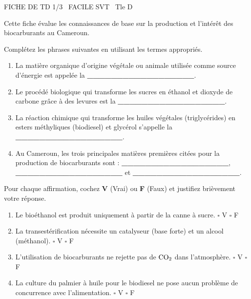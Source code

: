 \documentclass[11pt]{article}
\begin{document}
\begin{tcolorbox}[enhanced,colback=popink,colframe=popink,arc=10pt,boxrule=0pt,left=12pt,right=12pt,top=9pt,bottom=9pt]
{\color{white}\popxbold\small FICHE DE TD 1/3 \textbullet\ FACILE \hfill SVT \textbullet\ Tle D\par}
\end{tcolorbox}
\vspace{4pt}
Cette fiche évalue les connaissances de base sur la production et l'intérêt des biocarburants au Cameroun.

\begin{exercice}
Complétez les phrases suivantes en utilisant les termes appropriés.
\begin{enumerate}
    \item La matière organique d'origine végétale ou animale utilisée comme source d'énergie est appelée la \textbf{\_\_\_\_\_\_\_\_\_\_\_\_\_\_\_\_\_\_}.
    \item Le procédé biologique qui transforme les sucres en éthanol et dioxyde de carbone grâce à des levures est la \textbf{\_\_\_\_\_\_\_\_\_\_\_\_\_\_\_\_\_\_}.
    \item La réaction chimique qui transforme les huiles végétales (triglycérides) en esters méthyliques (biodiesel) et glycérol s'appelle la \textbf{\_\_\_\_\_\_\_\_\_\_\_\_\_\_\_\_\_\_}.
    \item Au Cameroun, les trois principales matières premières citées pour la production de biocarburants sont : \textbf{\_\_\_\_\_\_\_\_\_\_\_\_\_\_\_\_\_\_}, \textbf{\_\_\_\_\_\_\_\_\_\_\_\_\_\_\_\_\_\_} et \textbf{\_\_\_\_\_\_\_\_\_\_\_\_\_\_\_\_\_\_}.
\end{enumerate}
\end{exercice}

\begin{exercice}
Pour chaque affirmation, cochez \textbf{V} (Vrai) ou \textbf{F} (Faux) et justifiez brièvement votre réponse.
\begin{enumerate}
    \item Le bioéthanol est produit uniquement à partir de la canne à sucre. \hfill $\square$ V \quad $\square$ F
    \item La transestérification nécessite un catalyseur (base forte) et un alcool (méthanol). \hfill $\square$ V \quad $\square$ F
    \item L'utilisation de biocarburants ne rejette pas de $\ce{CO2}$ dans l'atmosphère. \hfill $\square$ V \quad $\square$ F
    \item La culture du palmier à huile pour le biodiesel ne pose aucun problème de concurrence avec l'alimentation. \hfill $\square$ V \quad $\square$ F
\end{enumerate}
\end{exercice}
\end{document}
